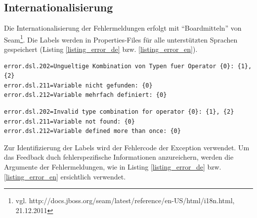 \subsection{Internationalisierung}

Die Internationalisierung der Fehlermeldungen erfolgt mit ``Boardmitteln'' von Seam\footnote{ vgl. http://docs.jboss.org/seam/latest/reference/en-US/html/i18n.html, 21.12.2011}. Die Labels werden in Properties-Files für alle unterstützten Sprachen gespeichert (Listing \ref{listing_error_de} bzw. \ref{listing_error_en}).

\begin{lstlisting}[float = htbp,caption={Deutsche Fehlermeldungen },label=listing_error_de]
error.dsl.202=Ungueltige Kombination von Typen fuer Operator {0}: {1}, {2}
error.dsl.211=Variable nicht gefunden: {0}
error.dsl.212=Variable mehrfach definiert: {0}
\end{lstlisting}

\begin{lstlisting}[float = htbp,caption={Englische Fehlermeldungen},label=listing_error_en]
error.dsl.202=Invalid type combination for operator {0}: {1}, {2}
error.dsl.211=Variable not found: {0}
error.dsl.212=Variable defined more than once: {0}
\end{lstlisting}

Zur Identifizierung der Labels wird der Fehlercode der Exception verwendet. Um das Feedback duch fehlerspezifische Informationen anzureichern, werden die Argumente der Fehlermeldungen, wie in Listing \ref{listing_error_de} bzw. \ref{listing_error_en} ersichtlich verwendet.




